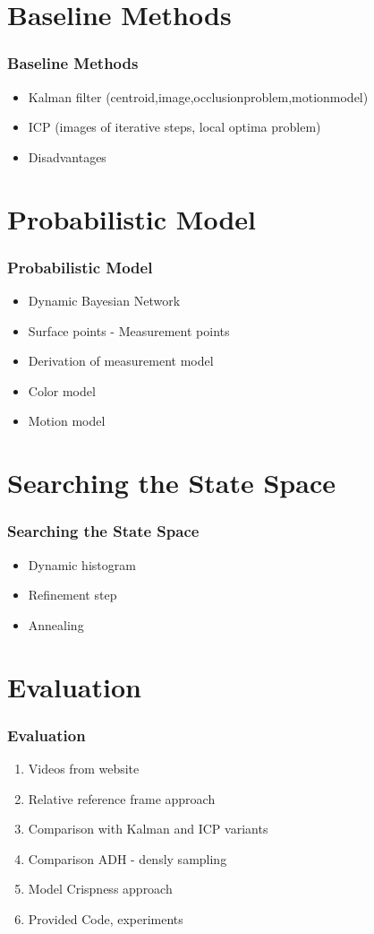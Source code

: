 \section{Baseline Methods}
\begin{frame}
  \frametitle{Baseline Methods}
  \begin{itemize}
  \item Kalman filter (centroid,image,occlusionproblem,motionmodel)
  \item ICP (images of iterative steps, local optima problem)
  \item Disadvantages
  \end{itemize}
\end{frame}

\section{Probabilistic Model}
\begin{frame}
  \frametitle{Probabilistic Model}
  \begin{itemize}
  \item Dynamic Bayesian Network
  \item Surface points - Measurement points
  \item Derivation of measurement model
  \item Color model
  \item Motion model
  \end{itemize}
\end{frame}

\section{Searching the State Space}
\begin{frame}
  \frametitle{Searching the State Space}
  \begin{itemize}
  \item Dynamic histogram
  \item Refinement step
  \item Annealing
  \end{itemize}
\end{frame}

\section{Evaluation}
\begin{frame}
  \frametitle{Evaluation}
  \begin{enumerate}
  \item Videos from website
  \item Relative reference frame approach
  \item Comparison with Kalman and ICP variants
  \item Comparison ADH - densly sampling
  \item Model Crispness approach
  \item Provided Code, experiments
  \end{enumerate}
\end{frame}

